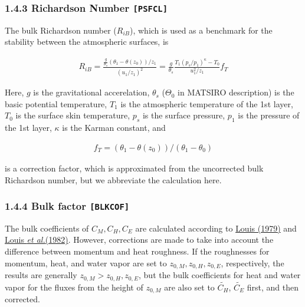 \hypertarget{richardson-number-psfcl}{%
\subsubsection{\texorpdfstring{1.4.3 Richardson Number
\texttt{{[}PSFCL{]}}}{1.4.3 Richardson Number {[}PSFCL{]}}}\label{richardson-number-psfcl}}

The bulk Richardson number (\(R_{iB}\)), which is used as a benchmark
for the stability between the atmospheric surfaces, is

\begin{eqnarray}
R_{iB} =
            \frac{ \frac{g}{\theta_s} (\theta_1 - \theta(z_0))/z_1 }
              { (u_1/z_1)^2                                  }
       = \frac{g}{\theta_s}
         \frac{T_1 (p_s/p_1)^\kappa - T_0 }{u_1^2/z_1} f_T
\end{eqnarray}

Here, \(g\) is the gravitational accerelation, \(\theta_s\)
(\(\Theta_0\) in MATSIRO description) is the basic potential
temperature, \(T_1\) is the atmospheric temperature of the 1st layer,
\(T_0\) is the surface skin temperature, \(p_s\) is the surface
pressure, \(p_1\) is the pressure of the 1st layer, $\kappa $ is the
Karman constant, and

\begin{eqnarray}
f_T = (\theta_1 - \theta(z_0))/(\theta_1 - \theta_0)
\end{eqnarray}

is a correction factor, which is approximated from the uncorrected bulk
Richardson number, but we abbreviate the calculation here.

\hypertarget{bulk-factor-blkcof}{%
\subsubsection{\texorpdfstring{1.4.4 Bulk factor
\texttt{{[}BLKCOF{]}}}{1.4.4 Bulk factor {[}BLKCOF{]}}}\label{bulk-factor-blkcof}}

The bulk coefficients of \(C_M,C_H,C_E\) are calculated according to
\href{./papers/Louis1979_Article_AParametricModelOfVerticalEddy.pdf}{Louis
(1979)} and
\href{./papers/Louis1982_a_short_history_of_the_operational_pbl_parameterization_at_ecmwf.pdf}{Louis
{\emph{et al.}}(1982)}. However, corrections are made to take into
account the difference between momentum and heat roughness. If the
roughnesses for momentum, heat, and water vapor are set to
\(z_{0,M}, z_{0,H}, z_{0,E}\), respectively, the results are generally
\(z_{0,M} > z_{0,H}, z_{0,E}\), but the bulk coefficients for heat and
water vapor for the fluxes from the height of \(z_{0,M}\) are also set
to \(\widetilde{C_H}\), \(\widetilde{C_E}\) first, and then corrected.

